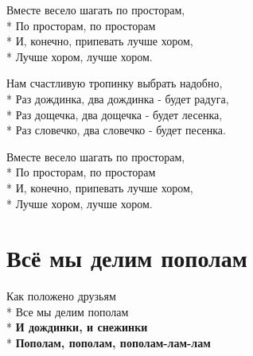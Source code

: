 \medskip

\begin{minipage}{\linewidth}
\hspace*{1.5em}Вместе весело шагать по просторам,\\*
\hspace*{1.5em}По просторам, по просторам\\*
\hspace*{1.5em}И, конечно, припевать лучше хором,\\*
\hspace*{1.5em}Лучше хором, лучше хором.\\
\end{minipage}\par\medskip\nobreak

\medskip

\begin{minipage}{\linewidth}
Нам счастливую тропинку выбрать надобно,\\*
Раз дождинка, два дождинка - будет радуга,\\*
Раз дощечка, два дощечка - будет лесенка,\\*
Раз словечко, два словечко - будет песенка.\\
\end{minipage}\par\medskip\nobreak

\medskip

\begin{minipage}{\linewidth}
\hspace*{1.5em}Вместе весело шагать по просторам,\\*
\hspace*{1.5em}По просторам, по просторам\\*
\hspace*{1.5em}И, конечно, припевать лучше хором,\\*
\hspace*{1.5em}Лучше хором, лучше хором.\\
\end{minipage}

\vspace{\fill}\newpage

\section{Всё мы делим пополам}
\label{song:Всё_мы_делим_пополам}

\begin{minipage}{\linewidth}
Как положено друзьям\\*
Все мы делим пополам\\*
\textbf{И дождинки, и снежинки}\\*
\textbf{Пополам, пополам, пополам-лам-лам}\\
\end{minipage}\par\medskip\nobreak

